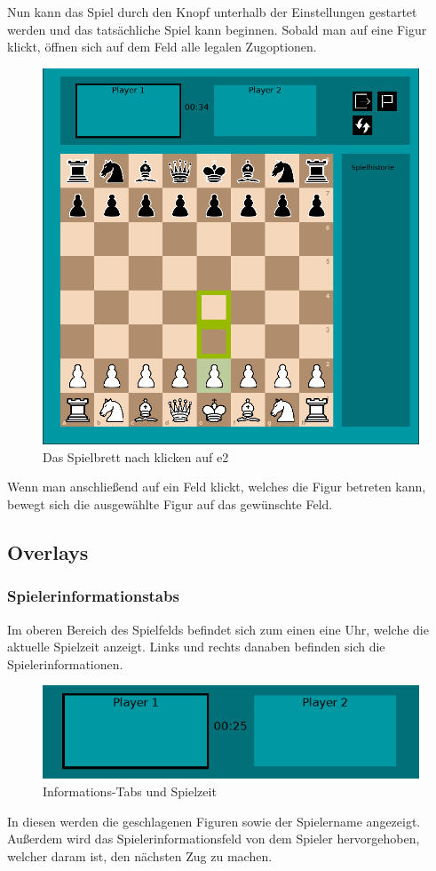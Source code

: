 \documentclass[a4paper, 10pt]{scrartcl}
\begin{document}
Nun kann das Spiel durch den Knopf unterhalb der Einstellungen gestartet werden und das tatsächliche Spiel kann beginnen.
Sobald man auf eine Figur klickt, öffnen sich auf dem Feld alle legalen Zugoptionen.

\begin{figure}[h]
        \centering
        \includegraphics[width=0.5\linewidth]{assets/Spielbrett_pawn.PNG}
        \caption{Das Spielbrett nach klicken auf e2}
\end{figure}

Wenn man anschließend auf ein Feld klickt, welches die Figur betreten kann, bewegt
sich die ausgewählte Figur auf das gewünschte Feld.

\subsection{Overlays}

\subsubsection{Spielerinformationstabs}
Im oberen Bereich des Spielfelds befindet sich zum einen eine Uhr, welche die aktuelle Spielzeit anzeigt. Links und rechts danaben befinden sich die Spielerinformationen.

\begin{figure}[h]
        \centering
        \includegraphics[scale=0.7]{assets/infotabs.PNG}
        \caption{Informations-Tabs und Spielzeit}
\end{figure}
In diesen werden die geschlagenen Figuren sowie der Spielername angezeigt. Außerdem wird das Spielerinformationsfeld von dem Spieler hervorgehoben, welcher daram ist, den
nächsten Zug zu machen.
\end{document}
